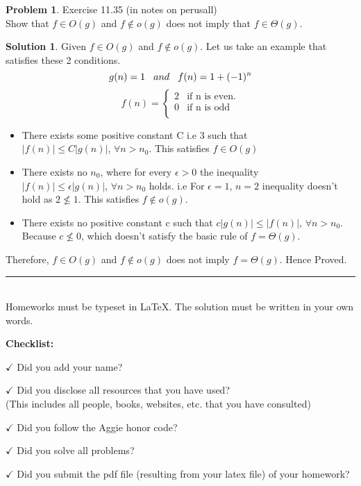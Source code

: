 \documentclass{article}
\theoremstyle{definition}
\newtheorem{problem}{Problem}
\newtheorem*{solution}{Solution}
\newcommand{\checklist}{\noindent\textbf{Checklist:}
\begin{compactitem}[$\Box$] 
\item[$\checkmark$] Did you add your name? 
\item[$\checkmark$] Did you disclose all resources that you have used? \\
(This includes all people, books, websites, etc. that you have consulted)
\item[$\checkmark$] Did you follow the Aggie honor code? 
\item[$\checkmark$] Did you solve all problems? 
\item[$\checkmark$] Did you submit the pdf file (resulting from your latex file)
  of your homework?
\end{compactitem}
}
\begin{document}
\begin{problem}
Exercise 11.35 (in notes on perusall) \\
Show that $f \in O(g)$ and $f \notin o(g)$ does not imply that $f \in \Theta(g)$.
\begin{solution}
Given $f \in O(g)$ and $f \notin o(g)$. Let us take an example that satisfies these 2 conditions.
$$g(n) = 1 \hspace{3mm} and \hspace{3mm} f(n) = 1 + (-1)^n$$
\begin{equation}
  f(n)=\begin{cases}
    2 & \text{if n is even}.\\
    0 & \text{if n is odd}\\
  \end{cases}
\end{equation}
\begin{itemize}
\item There exists some positive constant C i.e 3 such that \\
$\lvert f(n) \rvert \leq C \lvert g(n) \rvert$, $\forall n > n_0$. This satisfies $f \in O(g)$
\item There exists no $n_0$, where for every $\epsilon > 0$ the inequality \\
$\lvert f(n) \rvert \leq \epsilon \lvert g(n) \rvert$, $\forall n > n_0$ holds. i.e For $\epsilon = 1$, $n = 2$ inequality doesn't hold as $2 \nleqslant 1$. This satisfies $f \notin o(g)$.
\item There exists no positive constant c such that $c\lvert g(n) \rvert \leq \lvert f(n) \rvert$, $\forall n > n_0$. Because $c \nleqslant 0$, which doesn't satisfy the basic rule of $f = \Theta{(g)}$.
\end{itemize}
Therefore, $f \in O(g)$ and $f \notin o(g)$ does not imply $f = \Theta{(g)}$. Hence Proved.
\end{solution}
\end{problem}

\noindent\rule{12.2cm}{0.4pt} \\

Homeworks must be typeset in \LaTeX{}. The solution must be written in
your own words. 









\goodbreak
\checklist
\end{document}
